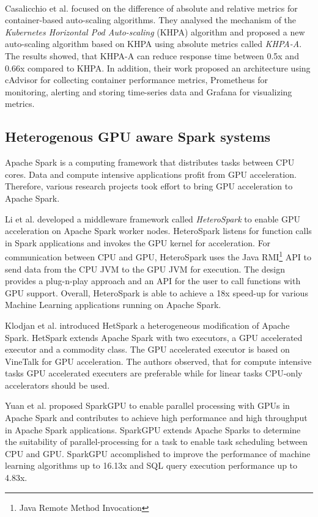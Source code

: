 \paragraph{}Casalicchio et al. \cite{Casalicchio2017AutoScaleCont} focused on the difference of absolute and relative metrics for container-based auto-scaling algorithms. They analysed the mechanism of the \textit{Kubernetes Horizontal Pod Auto-scaling} (KHPA) algorithm and proposed a new auto-scaling algorithm based on KHPA using absolute metrics called \textit{KHPA-A}. The results showed, that KHPA-A can reduce response time between 0.5x and 0.66x compared to KHPA. In addition, their work proposed an architecture using cAdvisor for collecting container performance metrics, Prometheus for monitoring, alerting and storing time-series data and Grafana for visualizing metrics.


\subsection{Heterogenous GPU aware Spark systems}
Apache Spark is a computing framework that distributes tasks between CPU cores. Data and compute intensive applications profit from GPU acceleration. Therefore, various research projects took effort to bring GPU acceleration to Apache Spark.


Li et al. \cite{Li2015HeteroSpark} developed a middleware framework called \textit{HeteroSpark} to enable GPU acceleration on Apache Spark worker nodes. HeteroSpark listens for function calls in Spark applications and invokes the GPU kernel for acceleration. For communication between CPU and GPU, HeteroSpark uses the Java RMI\footnote{Java Remote Method Invocation} API to send data from the CPU JVM to the GPU JVM for execution.
The design provides a plug-n-play approach and an API for the user to call functions with GPU support.
Overall, HeteroSpark is able to achieve a 18x speed-up for various Machine Learning applications running on Apache Spark.


Klodjan et al. \cite{Klodjan2018HetSpark} introduced HetSpark a heterogeneous modification of Apache Spark.
HetSpark extends Apache Spark with two executors, a GPU accelerated executor and a commodity class. The GPU accelerated executor is based on VineTalk\cite{Mavridis2017VineTalk} for GPU acceleration.
The authors observed, that for compute intensive tasks GPU accelerated executers are preferable while for linear tasks CPU-only accelerators should be used.


Yuan et al. \cite{Yuan2016SparkGPU} proposed SparkGPU to enable parallel processing with GPUs in Apache Spark and contributes to achieve high performance and high throughput in Apache Spark applications.
SparkGPU extends Apache Sparks to determine the suitability of parallel-processing for a task to enable task scheduling between CPU and GPU. 
SparkGPU accomplished to improve the performance of machine learning algorithms up to 16.13x and SQL query execution performance up to 4.83x.


